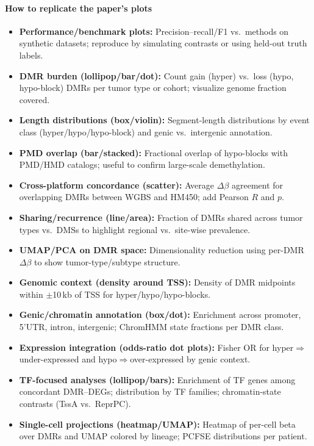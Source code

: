 \documentclass[10pt]{extarticle}
\begin{document}
\paragraph{How to replicate the paper's plots}
\begin{itemize}[label=-]
  \item \textbf{Performance/benchmark plots:} Precision–recall/F1 vs.\ methods on synthetic datasets; reproduce by simulating contrasts or using held-out truth labels.
  \item \textbf{DMR burden (lollipop/bar/dot):} Count gain (hyper) vs.\ loss (hypo, hypo-block) DMRs per tumor type or cohort; visualize genome fraction covered.
  \item \textbf{Length distributions (box/violin):} Segment-length distributions by event class (hyper/hypo/hypo-block) and genic vs.\ intergenic annotation.
  \item \textbf{PMD overlap (bar/stacked):} Fractional overlap of hypo-blocks with PMD/HMD catalogs; useful to confirm large-scale demethylation.
  \item \textbf{Cross-platform concordance (scatter):} Average $\Delta\beta$ agreement for overlapping DMRs between WGBS and HM450; add Pearson $R$ and $p$.
  \item \textbf{Sharing/recurrence (line/area):} Fraction of DMRs shared across tumor types vs.\ DMSs to highlight regional vs.\ site-wise prevalence.
  \item \textbf{UMAP/PCA on DMR space:} Dimensionality reduction using per-DMR $\Delta\beta$ to show tumor-type/subtype structure.
  \item \textbf{Genomic context (density around TSS):} Density of DMR midpoints within $\pm$10\,kb of TSS for hyper/hypo/hypo-blocks.
  \item \textbf{Genic/chromatin annotation (box/dot):} Enrichment across promoter, 5'UTR, intron, intergenic; ChromHMM state fractions per DMR class.
  \item \textbf{Expression integration (odds-ratio dot plots):} Fisher OR for hyper$\Rightarrow$under-expressed and hypo$\Rightarrow$over-expressed by genic context.
  \item \textbf{TF-focused analyses (lollipop/bars):} Enrichment of TF genes among concordant DMR–DEGs; distribution by TF families; chromatin-state contrasts (TssA vs.\ ReprPC).
  \item \textbf{Single-cell projections (heatmap/UMAP):} Heatmap of per-cell beta over DMRs and UMAP colored by lineage; PCFSE distributions per patient.
\end{itemize}
\end{document}
